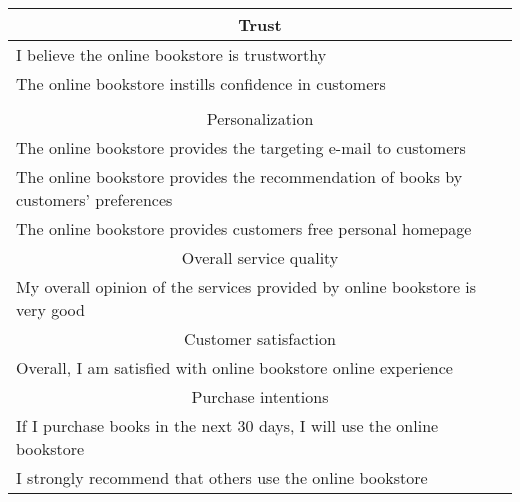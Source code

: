 \begin{anexosenv}
\begin{table}[]
{\begin{tabular}{|l|l|l|}
\multicolumn{3}{|c|}{\cellcolor[HTML]{C0C0C0}Trust} \\ \hline
\multicolumn{3}{|l|}{I believe the online bookstore is trustworthy} \\ \hline
\multicolumn{3}{|l|}{The online bookstore instills confidence in customers} \\ \hline
\multicolumn{3}{|c|}{\cellcolor[HTML]{C0C0C0}} \\
\multicolumn{3}{|c|}{\multirow{-2}{*}{\cellcolor[HTML]{C0C0C0}Personalization}} \\ \hline
\multicolumn{3}{|l|}{The online bookstore provides the targeting e-mail to customers} \\ \hline
\multicolumn{3}{|l|}{The online bookstore provides the recommendation of books by customers’ preferences} \\ \hline
\multicolumn{3}{|l|}{The online bookstore provides customers free personal homepage} \\ \hline
\multicolumn{3}{|c|}{\cellcolor[HTML]{C0C0C0}Overall service quality} \\ \hline
\multicolumn{3}{|l|}{My overall opinion of the services provided by online bookstore is very good} \\ \hline
\multicolumn{3}{|c|}{\cellcolor[HTML]{C0C0C0}Customer satisfaction} \\ \hline
\multicolumn{3}{|l|}{Overall, I am satisfied with online bookstore online experience} \\ \hline
\multicolumn{3}{|c|}{\cellcolor[HTML]{C0C0C0}Purchase intentions} \\ \hline
\multicolumn{3}{|l|}{If I purchase books in the next 30 days, I will use the online bookstore} \\ \hline
\multicolumn{3}{|l|}{I strongly recommend that others use the online bookstore} \\ \hline
\end{tabular}
}
\end{table}


\end{anexosenv}
